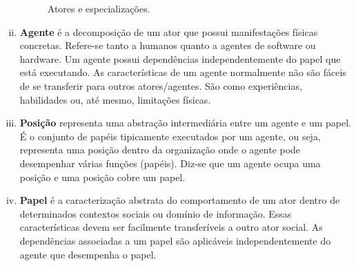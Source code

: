 \begin{enumerate}[i.]
                    \begin{figure}[h!]
                        \centering
                            \caption{Atores e especializações.}
                            \label{fig:atores}
                    \end{figure}
                    
                    \item \textbf{Agente} é a decomposição de um ator que possui manifestações físicas concretas. Refere-se tanto a humanos quanto a agentes de software ou hardware. Um agente possui dependências independentemente do papel que está executando. As características de um agente normalmente não são fáceis de se transferir para outros atores/agentes. São como experiências, habilidades ou, até mesmo, limitações físicas.
                    \item \textbf{Posição} representa uma abstração intermediária entre um agente e um papel. É o conjunto de papéis tipicamente executados por um agente, ou seja, representa uma posição dentro da organização onde o agente pode desempenhar várias funções (papéis). Diz-se que um agente ocupa uma posição e uma posição cobre um papel.
                    \item \textbf{Papel} é a caracterização abstrata do comportamento de um ator dentro de determinados contextos sociais ou domínio de informação. Essas características devem ser facilmente transferíveis a outro ator social. As dependências associadas a um papel são aplicáveis independentemente do agente que desempenha o papel.
                \end{enumerate}

